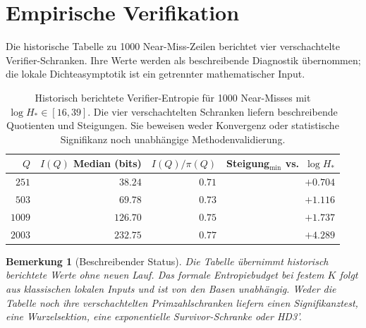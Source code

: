\documentclass[11pt,a4paper]{article}
\newtheorem{remark}[theorem]{Bemerkung}
\begin{document}
\section{Empirische Verifikation}
\label{sec:empirical}

Die historische Tabelle zu 1000 Near-Miss-Zeilen berichtet vier
verschachtelte Verifier-Schranken. Ihre Werte werden als beschreibende
Diagnostik übernommen; die lokale Dichteasymptotik ist ein getrennter
mathematischer Input.

\begin{table}[htb]
\centering
\begin{tabular}{rrrr}
\toprule
$Q$ & $I(Q)$ Median (bits) & $I(Q)/\pi(Q)$ & Steigung$_{\min}$ vs.\ $\log H_*$ \\
\midrule
$251$  & $38.24$  & $0.71$ & $+0.704$ \\
$503$  & $69.78$  & $0.73$ & $+1.116$ \\
$1009$ & $126.70$ & $0.75$ & $+1.737$ \\
$2003$ & $232.75$ & $0.77$ & $+4.289$ \\
\bottomrule
\end{tabular}
\caption{Historisch berichtete Verifier-Entropie für 1000 Near-Misses mit $\log H_*\in[16,39]$. Die vier verschachtelten Schranken liefern beschreibende Quotienten und Steigungen. Sie beweisen weder Konvergenz oder statistische Signifikanz noch unabhängige Methodenvalidierung.}
\label{tab:emp}
\end{table}

\begin{remark}[Beschreibender Status]
Die Tabelle übernimmt historisch berichtete Werte ohne neuen Lauf.
Das formale Entropiebudget bei festem $K$ folgt aus klassischen
lokalen Inputs und ist von den Basen unabhängig.
Weder die Tabelle noch ihre verschachtelten Primzahlschranken
liefern einen Signifikanztest, eine Wurzelsektion, eine exponentielle
Survivor-Schranke oder HD3'.
\end{remark}
\end{document}
